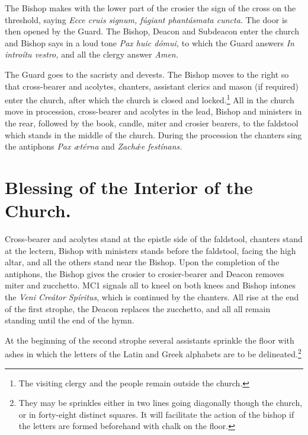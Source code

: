 \documentclass[letterpaper]{report}
\begin{document}
{    \rubric The Bishop makes with the lower part of the crosier the sign of the
    cross on the threshold, saying \textit{Ecce cru\cross is signum, f\'ugiant
    phant\'asmata cuncta.} The door is then opened by the Guard. The Bishop,
    Deacon and Subdeacon enter the church and Bishop says in a loud tone
    \textit{Pax huic d\'omui,} to which the Guard answers \textit{In introítu
    vestro,} and all the clergy answer \textit{Amen.}

    \rubric The Guard goes to the sacristy and devests. The Bishop moves to the
    right so that cross-bearer and acolytes, chanters, assistant clerics and
    mason (if required) enter the church, after which the church is closed and
    locked.\footnote{The visiting clergy and the people remain outside the
    church.} All in the church move in procession, cross-bearer and acolytes in
    the lead, Bishop and ministers in the rear, followed by the book, candle,
    miter and crosier bearers, to the faldstool which stands in the middle of
    the church. During the procession the chanters sing the antiphons
    \textit{Pax \ae t\'erna} and \textit{Zach\'\ae e fest\'inans.}

    \section{Blessing of the Interior of the Church.}

    \rubric Cross-bearer and acolytes stand at the epistle side of the
    faldstool, chanters stand at the lectern, Bishop with ministers stands
    before the faldstool, facing the high altar, and all the others stand near
    the Bishop. Upon the completion of the antiphons, the Bishop gives the
    crosier to crosier-bearer and Deacon removes miter and zucchetto. MC1
    signals all to kneel on both knees and Bishop intones the \textit{Veni
    Cre\'ator Sp\'iritus}, which is continued by the chanters. All rise at the
    end of the first strophe, the Deacon replaces the zucchetto, and all all
    remain standing until the end of the hymn.

    \rubric At the beginning of the second strophe several assistants sprinkle
    the floor with ashes in which the letters of the Latin and Greek alphabets
    are to be delineated.\footnote{They may be sprinkles either in two lines
    going diagonally though the church, or in forty-eight distinct squares. It
    will facilitate the action of the bishop if the letters are formed
    beforehand with chalk on the floor.}

}
\end{document}
